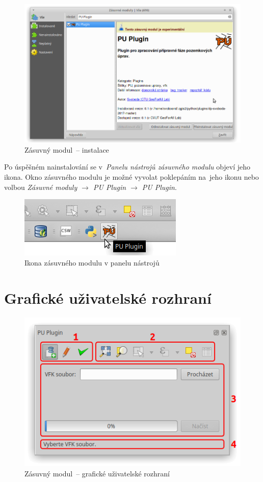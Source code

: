 	\begin{figure}[H]
		\centering
		\includegraphics[width=.8\textwidth]{./pictures/instalace-instalace_zasuvneho_modulu.png}
		\caption[Zásuvný modul~– instalace]{Zásuvný modul~– instalace}
		\label{fig:manual_instalace_puplugin}
 	\end{figure}

Po úspěšném nainstalování se v~\textit{Panelu nástrojů zásuvného modulu} objeví jeho ikona. Okno zásuvného modulu je možné vyvolat poklepáním na~jeho ikonu nebo volbou \textit{Zásuvné moduly $\rightarrow$ PU Plugin $\rightarrow$ PU Plugin}.

	\begin{figure}[H]
		\centering
		\includegraphics[width=.4\textwidth]{./pictures/instalace-toolbar.png}
		\caption[Ikona zásuvného modulu v panelu nástrojů]{Ikona zásuvného modulu v panelu nástrojů}
		\label{fig:manual_ikona_v_panelu_nastroju}
 	\end{figure}

\section{Grafické uživatelské rozhraní}
\label{manual_gui}

	\begin{figure}[H]
		\centering
		\includegraphics[width=.55\textwidth]{./pictures/main_gui.png}
		\caption[Zásuvný modul~– grafické uživatelské rozhraní]{Zásuvný modul~– grafické uživatelské rozhraní}
		\label{fig:manual_main_gui}
 	\end{figure}


